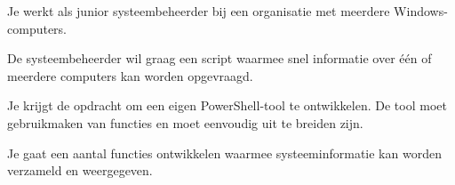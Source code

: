 Je werkt als junior systeembeheerder bij een organisatie met meerdere Windows-computers.

De systeembeheerder wil graag een script waarmee snel informatie over één of meerdere computers kan worden opgevraagd.

Je krijgt de opdracht om een eigen PowerShell-tool te ontwikkelen. De tool moet gebruikmaken van functies en moet eenvoudig uit te breiden zijn.

Je gaat een aantal functies ontwikkelen waarmee systeeminformatie kan worden verzameld en weergegeven.

